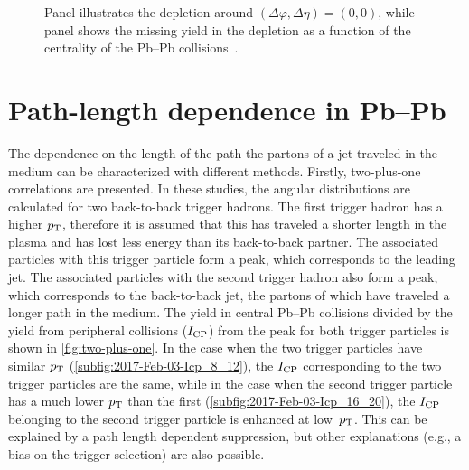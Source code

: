 \documentclass{PoS}
\begin{document}
\begin{figure}[!htbp]
  \caption{Panel \protect{} illustrates the depletion around $(\Delta\varphi,\Delta\eta) = (0,0)$, while panel \protect{} shows the missing yield in the depletion as a function of the centrality of the Pb--Pb collisions~\cite{Adam:2016tsv,Adam:2016ckp}.}
  \label{fig:depletion}
\end{figure}

\section{Path-length dependence in Pb--Pb}
The dependence on the length of the path the partons of a jet traveled in the medium can be characterized with different methods. Firstly, two-plus-one correlations are presented. In these studies, the angular distributions are calculated for two back-to-back trigger hadrons. The first trigger hadron has a higher $p_{\rm T}$, therefore it is assumed that this has traveled a shorter length in the plasma and has lost less energy than its back-to-back partner. The associated particles with this trigger particle form a peak, which corresponds to the leading jet. The associated particles with the second trigger hadron also form a peak, which corresponds to the back-to-back jet, the partons of which have traveled a longer path in the medium. The yield in central Pb--Pb collisions divided by the yield from peripheral collisions ($I_{\rm CP}$) from the peak for both trigger particles is shown in \cref{fig:two-plus-one}. In the case when the two trigger particles have similar $p_{\rm T}$ (\cref{subfig:2017-Feb-03-Icp_8_12}), the $I_{\rm CP}$ corresponding to the two trigger particles are the same, while in the case when the second trigger particle has a much lower $p_{\rm T}$ than the first (\cref{subfig:2017-Feb-03-Icp_16_20}), the $I_{\rm CP}$ belonging to the second trigger particle is enhanced at low~$p_{\rm T}$. This can be explained by a path length dependent suppression, but other explanations (e.g., a bias on the trigger selection) are also possible.
\end{document}
